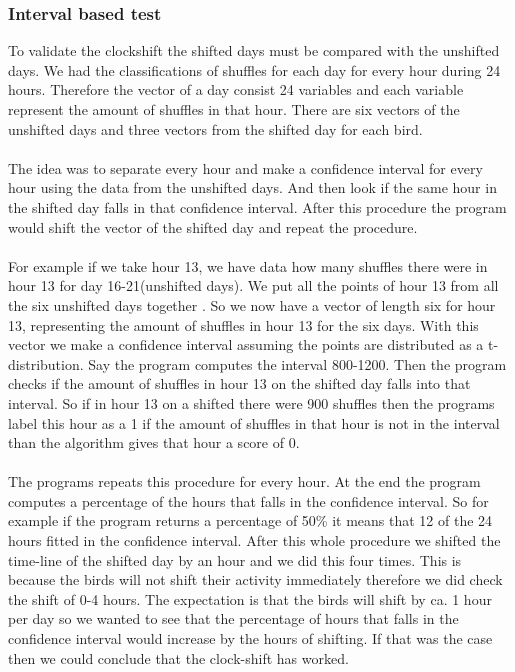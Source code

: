 \documentclass[a4paper]{article}
\begin{document}
\subsubsection*{Interval based test}
To validate the clockshift the shifted days must be compared with the unshifted days. We had the classifications of shuffles for each day for every hour during 24 hours. Therefore the vector of a day consist 24 variables and each variable represent the amount of shuffles in that hour. There are six vectors of the unshifted days and three vectors from the shifted day for each bird.\\\\
The idea was to separate every hour and make a confidence interval for every hour using the data from the unshifted days. And then look if the same hour in the shifted day falls in that confidence interval. After this procedure the program would shift the vector of the shifted day and repeat the procedure.\\\\ 
For example if we take hour 13, we have data how many shuffles there were in hour 13 for day 16-21(unshifted days). We put all the points of hour 13 from all the six unshifted days together . So we now have a vector of length six for hour 13, representing the amount of shuffles in hour 13 for the six days. With this vector we make a confidence interval assuming the points are distributed as a t-distribution. Say the program computes the interval 800-1200. Then the program checks if  the amount of shuffles in hour 13 on the shifted day falls into that interval. So if in hour 13 on a shifted there were 900 shuffles then the programs label this hour as a 1 if the amount of shuffles in that hour is not in the interval than the algorithm gives that hour a score of 0. \\\\
The programs repeats this procedure for every hour. At the end the program computes a percentage of the hours that falls in the confidence interval. So for example if the program returns a percentage of 50\% it means that 12 of the 24 hours fitted in the confidence interval. After this whole procedure we shifted the time-line of the shifted day by an hour and we did this four times. This is because the birds will not shift their activity immediately therefore we did check the shift of 0-4 hours. The expectation is that the birds will shift by ca. 1 hour per day so we wanted to see that the percentage of hours that falls in the confidence interval would increase by the hours of shifting. If that was the case then we could conclude that the clock-shift has worked. 
\end{document}
